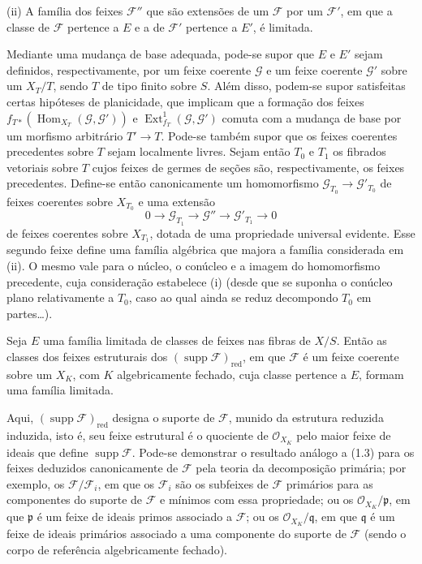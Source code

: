 \smallskip
\noindent (ii) A família dos feixes $\mathcal F''$ que são extensões de um
$\mathcal F$ por um $\mathcal F'$, em que a classe de $\mathcal F$ pertence
a $E$ e a de $\mathcal F'$ pertence a $E'$, é limitada.

Mediante uma mudança de base adequada, pode-se supor que $E$ e $E'$ sejam
definidos, respectivamente, por um feixe coerente $\mathcal G$ e um feixe
coerente $\mathcal G'$ sobre um $X_T/T$, sendo $T$ de tipo finito sobre $S$.
Além disso, podem-se supor satisfeitas certas hipóteses de planicidade, que
implicam que a formação dos feixes
$f_{T*}(\operatorname{Hom}_{X_T}(\mathcal G,\mathcal G'))$ e
$\operatorname{Ext}^{1}_{f_T}(\mathcal G,\mathcal G')$ comuta com a mudança
de base por um morfismo arbitrário $T'\longrightarrow T$. Pode-se também
supor que os feixes coerentes precedentes sobre $T$ sejam localmente livres.
Sejam então $T_0$ e $T_1$ os fibrados vetoriais sobre $T$ cujos feixes de
germes de seções são, respectivamente, os feixes precedentes. Define-se então
canonicamente um homomorfismo
$\mathcal G_{T_0}\longrightarrow\mathcal G'_{T_0}$ de feixes coerentes sobre
$X_{T_0}$ e uma extensão
\[
0\longrightarrow\mathcal G_{T_1}\longrightarrow\mathcal G''
\longrightarrow\mathcal G'_{T_1}\longrightarrow0
\]
de feixes coerentes sobre $X_{T_1}$, dotada de uma propriedade universal
evidente. Esse segundo feixe define uma família algébrica que majora a família
considerada em (ii). O mesmo vale para o núcleo, o conúcleo e a imagem do
homomorfismo
precedente, cuja consideração estabelece (i) (desde que se suponha o conúcleo
plano relativamente a $T_0$, caso ao qual ainda se reduz decompondo $T_0$ em
partes\ldots).

 Seja $E$ uma família limitada de classes de feixes
nas fibras de $X/S$. Então as classes dos feixes estruturais dos
$(\operatorname{supp}\mathcal F)_{\mathrm{red}}$, em que $\mathcal F$ é um
feixe coerente sobre um $X_K$, com $K$ algebricamente fechado, cuja classe
pertence a $E$, formam uma família limitada.

Aqui, $(\operatorname{supp}\mathcal F)_{\mathrm{red}}$ designa o suporte de
$\mathcal F$, munido da estrutura reduzida induzida, isto é, seu feixe
estrutural é o quociente de $\mathcal O_{X_K}$ pelo maior feixe de ideais que
define $\operatorname{supp}\mathcal F$. Pode-se demonstrar o resultado
análogo a (1.3) para os feixes deduzidos canonicamente de $\mathcal F$ pela
teoria da decomposição primária; por exemplo, os
$\mathcal F/\mathcal F_i$, em que os $\mathcal F_i$ são os subfeixes de
$\mathcal F$ primários para as componentes do suporte de $\mathcal F$ e
mínimos com essa propriedade; ou os $\mathcal O_{X_K}/\mathfrak p$, em que
$\mathfrak p$ é um feixe de ideais primos associado a $\mathcal F$; ou os
$\mathcal O_{X_K}/\mathfrak q$, em que $\mathfrak q$ é um feixe de ideais
primários associado a uma componente do suporte de $\mathcal F$ (sendo o
corpo de referência algebricamente fechado).

